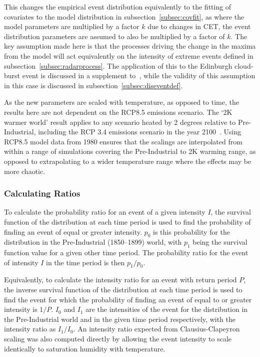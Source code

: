 This changes the empirical event distribution equivalently to the fitting of covariates to the model distribution in subsection~\ref{subsec:covfit},
    as where the model parameters are multiplied by a factor $k$ due to changes in CET,
    the event distribution parameters are assumed to also be multiplied by a factor of $k$.
The key assumption made here is that the processes driving the change in the maxima from the model will act equivalently
    on the intensity of extreme events defined in subsection~\ref{subsec:radarprocess}.
The application of this to the Edinburgh cloud-burst event is discussed in a supplement to~\cite{Tett_Soon},
    while the validity of this assumption in this case is discussed in subsection~\ref{subsec:diseventdef}.

As the new parameters are scaled with temperature,
    as opposed to time,
    the results here are not dependent on the RCP8.5 emissions scenario.
The `2K warmer world' result applies to any scenario heated by 2 degrees relative to Pre-Industrial,
    including the RCP 3.4 emissions scenario in the year 2100~\cite{Pielke_2021}.
Using RCP8.5 model data from 1980 ensures that the scalings are interpolated from within a range of simulations
    covering the Pre-Industrial to 2K warming range,
    as opposed to extrapolating to a wider temperature range where the effects may be more chaotic.

\subsubsection{Calculating Ratios}

To calculate the probability ratio for an event of a given intensity $I$,
    the survival function of the distribution at each time period is used to find the probability of finding an event of equal or greater intensity.
$p_0$ is this probability for the distribution in the Pre-Industrial (1850--1899) world,
    with $p_1$ being the survival function value for a given other time period.
The probability ratio for the event of intensity $I$ in the time period is then $p_1/p_0$.

Equivalently, to calculate the intensity ratio for an event with return period $P$,
    the inverse survival function of the distribution at each time period is used to find the event for which the probability of finding an event of equal to or greater intensity is $1/P$.
$I_0$ and $I_1$ are the intensities of the event for the distribution in the Pre-Industrial world and in the given time period respectively,
    with the intensity ratio as $I_1/I_0$.
An intensity ratio expected from Clausius-Clapeyron scaling was also computed directly by allowing the event intensity to scale identically to saturation humidity with temperature.

